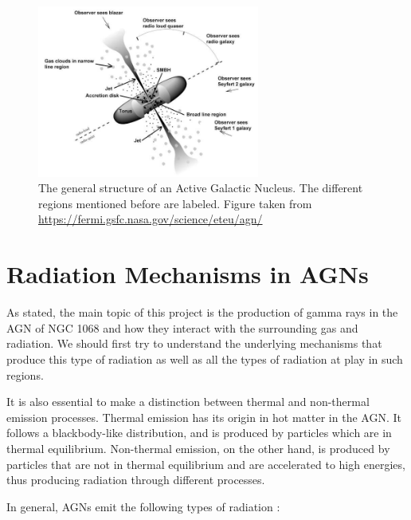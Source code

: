 \begin{figure}[H]
    \centering
    \includegraphics[width=0.65\textwidth]{Figures/AGN Structure.jpg}
    \caption{The general structure of an Active Galactic Nucleus. The different regions mentioned before are labeled. Figure taken from \url{https://fermi.gsfc.nasa.gov/science/eteu/agn/}}
    \label{fig:AGN_structure}
\end{figure}


\section{Radiation Mechanisms in AGNs}

As stated, the main topic of this project is the production of gamma rays in the AGN of NGC 1068 and how they interact with the surrounding gas and radiation. We should first try to understand the underlying mechanisms that produce this type of radiation as well as all the types of radiation at play in such regions.

It is also essential to make a distinction between thermal and non-thermal emission processes. Thermal emission has its origin in hot matter in the AGN. It follows a blackbody-like distribution, and is produced by particles which are in thermal equilibrium. Non-thermal emission, on the other hand, is produced by particles that are not in thermal equilibrium and are accelerated to high energies, thus producing radiation through different processes.


In general, AGNs emit the following types of radiation \citep{RadiativeProcesses}:

